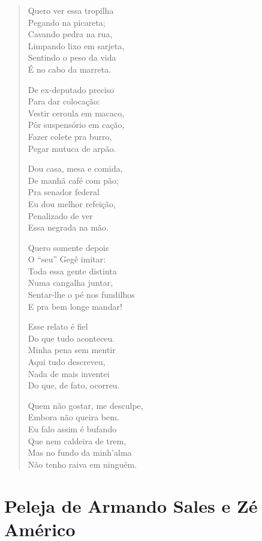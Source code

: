 \begin{verse}
Quero ver essa tropilha\\
Pegando na picareta;\\
Cavando pedra na rua,\\
Limpando lixo em sarjeta,\\
Sentindo o peso da vida\\
É no cabo da marreta.

De ex-deputado preciso\\
Para dar colocação:\\
Vestir ceroula em macaco,\\
Pôr suspensório em cação,\\
Fazer colete pra burro,\\
Pegar mutuca de arpão.

Dou casa, mesa e comida,\\
De manhã café com pão;\\
Pra senador federal\\
Eu dou melhor refeição, \\
Penalizado de ver\\
Essa negrada na mão.


Quero somente depois\\
O “seu” Gegê imitar:\\
Toda essa gente distinta\\
Numa cangalha juntar,\\
Sentar-lhe o pé nos fundilhos\\
E pra bem longe mandar!

Esse relato é fiel\\
Do que tudo aconteceu.\\
Minha pena sem mentir\\
Aqui tudo descreveu,\\
Nada de mais inventei\\
Do que, de fato, ocorreu.

Quem não gostar, me desculpe,\\
Embora não queira bem.\\
Eu falo assim é bufando\\
Que nem caldeira de trem,\\
Mas no fundo da minh’alma\\
Não tenho raiva em ninguém.
\end{verse}

\chapter{Peleja de Armando Sales e Zé Américo}

